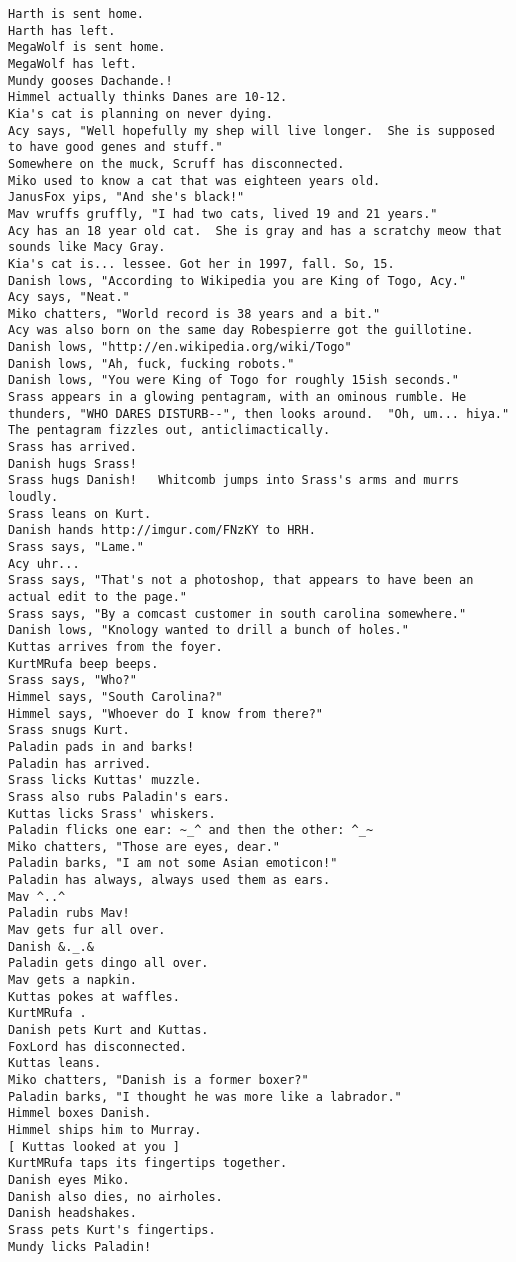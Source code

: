 \begin{verbatim}
Harth is sent home.
Harth has left.
MegaWolf is sent home.
MegaWolf has left.
Mundy gooses Dachande.!
Himmel actually thinks Danes are 10-12.
Kia's cat is planning on never dying.
Acy says, "Well hopefully my shep will live longer.  She is supposed to have good genes and stuff."
Somewhere on the muck, Scruff has disconnected.
Miko used to know a cat that was eighteen years old.
JanusFox yips, "And she's black!"
Mav wruffs gruffly, "I had two cats, lived 19 and 21 years."
Acy has an 18 year old cat.  She is gray and has a scratchy meow that sounds like Macy Gray.
Kia's cat is... lessee. Got her in 1997, fall. So, 15.
Danish lows, "According to Wikipedia you are King of Togo, Acy."
Acy says, "Neat."
Miko chatters, "World record is 38 years and a bit."
Acy was also born on the same day Robespierre got the guillotine.
Danish lows, "http://en.wikipedia.org/wiki/Togo"
Danish lows, "Ah, fuck, fucking robots."
Danish lows, "You were King of Togo for roughly 15ish seconds."
Srass appears in a glowing pentagram, with an ominous rumble. He thunders, "WHO DARES DISTURB--", then looks around.  "Oh, um... hiya."  The pentagram fizzles out, anticlimactically.
Srass has arrived.
Danish hugs Srass!
Srass hugs Danish!   Whitcomb jumps into Srass's arms and murrs loudly.
Srass leans on Kurt.
Danish hands http://imgur.com/FNzKY to HRH.
Srass says, "Lame."
Acy uhr...
Srass says, "That's not a photoshop, that appears to have been an actual edit to the page."
Srass says, "By a comcast customer in south carolina somewhere."
Danish lows, "Knology wanted to drill a bunch of holes."
Kuttas arrives from the foyer.
KurtMRufa beep beeps.
Srass says, "Who?"
Himmel says, "South Carolina?"
Himmel says, "Whoever do I know from there?"
Srass snugs Kurt.
Paladin pads in and barks!
Paladin has arrived.
Srass licks Kuttas' muzzle.
Srass also rubs Paladin's ears.
Kuttas licks Srass' whiskers.
Paladin flicks one ear: ~_^ and then the other: ^_~
Miko chatters, "Those are eyes, dear."
Paladin barks, "I am not some Asian emoticon!"
Paladin has always, always used them as ears.
Mav ^..^
Paladin rubs Mav!
Mav gets fur all over.
Danish &._.&
Paladin gets dingo all over.
Mav gets a napkin.
Kuttas pokes at waffles.
KurtMRufa .
Danish pets Kurt and Kuttas.
FoxLord has disconnected.
Kuttas leans.
Miko chatters, "Danish is a former boxer?"
Paladin barks, "I thought he was more like a labrador."
Himmel boxes Danish.
Himmel ships him to Murray.
[ Kuttas looked at you ]
KurtMRufa taps its fingertips together.
Danish eyes Miko.
Danish also dies, no airholes.
Danish headshakes.
Srass pets Kurt's fingertips.
Mundy licks Paladin!

\end{verbatim}
